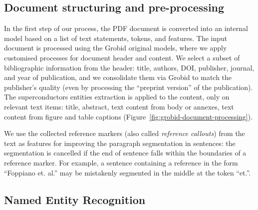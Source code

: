 \documentclass[]{interact}
\theoremstyle{plain}%
\theoremstyle{definition}
\theoremstyle{remark}
\begin{document}
\subsection{Document structuring and pre-processing}
\label{subsubsec:document-structuring}
In the first step of our process, the PDF document is converted into an internal model based on a list of text statements, tokens, and features.
The input document is processed using the Grobid original models, where we apply customised processes for document header and content.
We select a subset of bibliographic information from the header: title, authors, DOI, publisher, journal, and year of publication, and we consolidate them via Grobid to match the publisher's quality (even by processing the ``preprint version'' of the publication).
The superconductors entities extraction is applied to the content, only on relevant text items: title, abstract, text content from body or annexes, text content from figure and table captions (Figure~\ref{fig:grobid-document-processing}).

We use the collected reference markers (also called \textit{reference callouts}) from the text as features for improving the paragraph segmentation in sentences: the segmentation is cancelled if the end of sentence falls within the boundaries of a reference marker.
For example, a sentence containing a reference in the form ``Foppiano et. al.'' may be mistakenly segmented in the middle at the token ``et.''.



\subsection{Named Entity Recognition}
\label{subsubsec:extraction}
\end{document}
